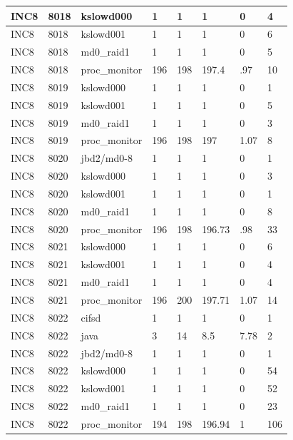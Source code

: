 \begin{table}[h]
\begin{center}
{\begin{tabular}{l|l|l|l|l|l|l|l}
INC8     & 8018     & kslowd000     & 1     & 1     & 1     & 0     & 4\\ \hline
INC8     & 8018     & kslowd001     & 1     & 1     & 1     & 0     & 6\\ \hline
INC8     & 8018     & md0\_raid1     & 1     & 1     & 1     & 0     & 5\\ \hline
INC8     & 8018     & proc\_monitor     & 196     & 198     & 197.4     & .97     & 10\\ \hline \hline

INC8     & 8019     & kslowd000     & 1     & 1     & 1     & 0     & 1\\ \hline
INC8     & 8019     & kslowd001     & 1     & 1     & 1     & 0     & 5\\ \hline
INC8     & 8019     & md0\_raid1     & 1     & 1     & 1     & 0     & 3\\ \hline
INC8     & 8019     & proc\_monitor     & 196     & 198     & 197     & 1.07     & 8\\ \hline \hline

INC8     & 8020     & jbd2/md0-8     & 1     & 1     & 1     & 0     & 1\\ \hline
INC8     & 8020     & kslowd000     & 1     & 1     & 1     & 0     & 3\\ \hline
INC8     & 8020     & kslowd001     & 1     & 1     & 1     & 0     & 1\\ \hline
INC8     & 8020     & md0\_raid1     & 1     & 1     & 1     & 0     & 8\\ \hline
INC8     & 8020     & proc\_monitor     & 196     & 198     & 196.73     & .98     & 33\\ \hline \hline

INC8     & 8021     & kslowd000     & 1     & 1     & 1     & 0     & 6\\ \hline
INC8     & 8021     & kslowd001     & 1     & 1     & 1     & 0     & 4\\ \hline
INC8     & 8021     & md0\_raid1     & 1     & 1     & 1     & 0     & 4\\ \hline
INC8     & 8021     & proc\_monitor     & 196     & 200     & 197.71     & 1.07     & 14\\ \hline \hline

INC8     & 8022     & cifsd     & 1     & 1     & 1     & 0     & 1\\ \hline
INC8     & 8022     & java     & 3     & 14     & 8.5     & 7.78     & 2\\ \hline
INC8     & 8022     & jbd2/md0-8     & 1     & 1     & 1     & 0     & 1\\ \hline
INC8     & 8022     & kslowd000     & 1     & 1     & 1     & 0     & 54\\ \hline
INC8     & 8022     & kslowd001     & 1     & 1     & 1     & 0     & 52\\ \hline
INC8     & 8022     & md0\_raid1     & 1     & 1     & 1     & 0     & 23\\ \hline
INC8     & 8022     & proc\_monitor     & 194     & 198     & 196.94     & 1     & 106\\ \hline \hline


\end{tabular}}
\end{center}
\end{table}
